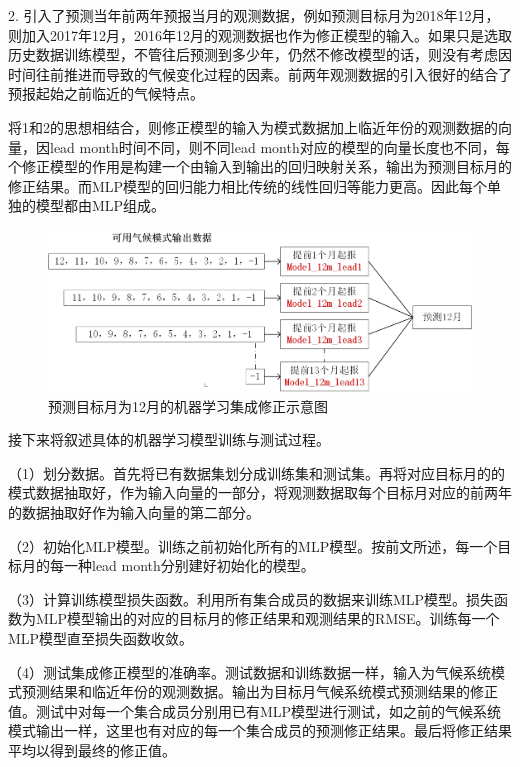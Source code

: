 2. 引入了预测当年前两年预报当月的观测数据，例如预测目标月为2018年12月，则加入2017年12月，2016年12月的观测数据也作为修正模型的输入。如果只是选取历史数据训练模型，不管往后预测到多少年，仍然不修改模型的话，则没有考虑因时间往前推进而导致的气候变化过程的因素。前两年观测数据的引入很好的结合了预报起始之前临近的气候特点。

将1和2的思想相结合，则修正模型的输入为模式数据加上临近年份的观测数据的向量，因lead month时间不同，则不同lead month对应的模型的向量长度也不同，每个修正模型的作用是构建一个由输入到输出的回归映射关系，输出为预测目标月的修正结果。而MLP模型的回归能力相比传统的线性回归等能力更高。因此每个单独的模型都由MLP组成。 

 \begin{figure}[H] %
\label{prectresult}
  \centering
  \includegraphics[scale=0.88]{figures/ML集成示意图.jpg}
  \caption{预测目标月为12月的机器学习集成修正示意图}
  \label{fig:mlDec}
\end{figure}

接下来将叙述具体的机器学习模型训练与测试过程。

（1）划分数据。首先将已有数据集划分成训练集和测试集。再将对应目标月的的模式数据抽取好，作为输入向量的一部分，将观测数据取每个目标月对应的前两年的数据抽取好作为输入向量的第二部分。

（2）初始化MLP模型。训练之前初始化所有的MLP模型。按前文所述，每一个目标月的每一种lead month分别建好初始化的模型。

（3）计算训练模型损失函数。利用所有集合成员的数据来训练MLP模型。损失函数为MLP模型输出的对应的目标月的修正结果和观测结果的RMSE。训练每一个MLP模型直至损失函数收敛。

（4）测试集成修正模型的准确率。测试数据和训练数据一样，输入为气候系统模式预测结果和临近年份的观测数据。输出为目标月气候系统模式预测结果的修正值。测试中对每一个集合成员分别用已有MLP模型进行测试，如之前的气候系统模式输出一样，这里也有对应的每一个集合成员的预测修正结果。最后将修正结果平均以得到最终的修正值。

